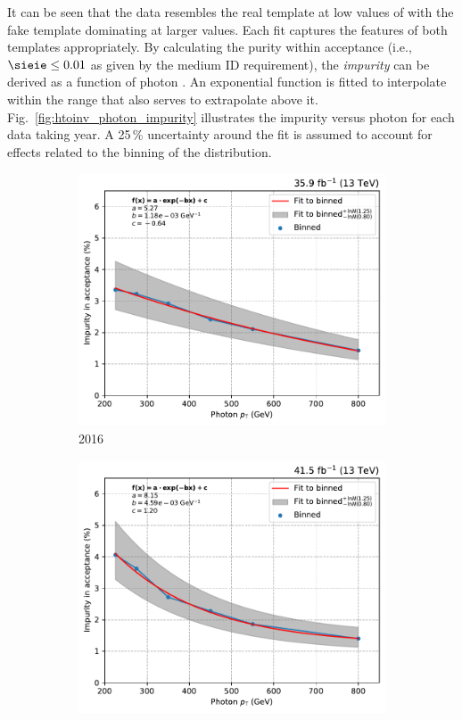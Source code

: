 It can be seen that the data resembles the real template at low values of \sieie with the fake template dominating at larger values. Each fit captures the features of both templates appropriately. By calculating the purity within acceptance (i.e., $\sieie \leq \text{0.01}$ as given by the medium ID requirement), the \emph{impurity} can be derived as a function of photon \pt. An exponential function is fitted to interpolate within the range that also serves to extrapolate above it. Fig.~\ref{fig:htoinv_photon_impurity} illustrates the impurity versus photon \pt for each data taking year. A 25\,\% uncertainty around the fit is assumed to account for effects related to the binning of the \sieie distribution.

\begin{figure}[htbp]
    \centering
    \begin{subfigure}[b]{0.32\textwidth}
        \includegraphics[width=\textwidth]{figures/photon_purity/2016/impurity_plot_2016.pdf}
        \caption{2016}
    \end{subfigure}
    \hfill
    \begin{subfigure}[b]{0.32\textwidth}
        \includegraphics[width=\textwidth]{figures/photon_purity/2017/impurity_plot_2017.pdf}

\end{subfigure}
\end{figure}
